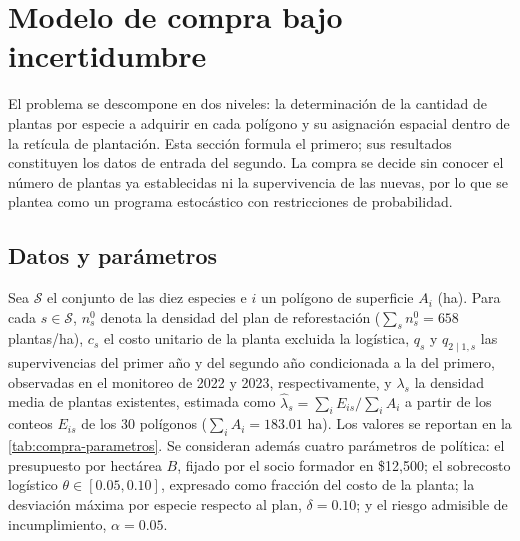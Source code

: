 \section{Modelo de compra bajo incertidumbre}
\label{sec:modelo-compra}

El problema se descompone en dos niveles: la determinación de la cantidad de plantas por especie a adquirir en cada polígono y su asignación espacial dentro de la retícula de plantación. Esta sección formula el primero; sus resultados constituyen los datos de entrada del segundo. La compra se decide sin conocer el número de plantas ya establecidas ni la supervivencia de las nuevas, por lo que se plantea como un programa estocástico con restricciones de probabilidad.

\subsection{Datos y parámetros}
\label{subsec:compra-parametros}

Sea $\mathcal{S}$ el conjunto de las diez especies e $i$ un polígono de superficie $A_i$ (ha). Para cada $s\in\mathcal{S}$, $n_s^0$ denota la densidad del plan de reforestación ($\sum_sn_s^0=658$ plantas/ha), $c_s$ el costo unitario de la planta excluida la logística, $q_s$ y $q_{2\mid1,s}$ las supervivencias del primer año y del segundo año condicionada a la del primero, observadas en el monitoreo de 2022 y 2023, respectivamente, y $\lambda_s$ la densidad media de plantas existentes, estimada como $\hat{\lambda}_s=\sum_iE_{is}/\sum_iA_i$ a partir de los conteos $E_{is}$ de los 30 polígonos ($\sum_iA_i=183.01$ ha). Los valores se reportan en la \cref{tab:compra-parametros}. Se consideran además cuatro parámetros de política: el presupuesto por hectárea $B$, fijado por el socio formador en \$12{,}500; el sobrecosto logístico $\theta\in[0.05,0.10]$, expresado como fracción del costo de la planta; la desviación máxima por especie respecto al plan, $\delta=0.10$; y el riesgo admisible de incumplimiento, $\alpha=0.05$.

